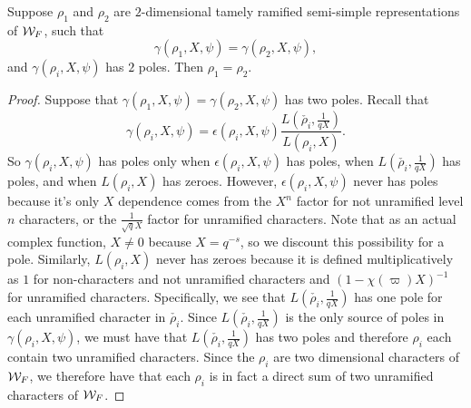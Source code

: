 \begin{lemma}
  \label{lem:gamma-two-poles}
  Suppose $\rho_1$ and $\rho_2$ are $2$-dimensional tamely ramified semi-simple representations of $\mathcal{W}_F$, such that
  \[\gamma(\rho_1,X,\psi) = \gamma(\rho_2,X,\psi),\]
  and $\gamma(\rho_i,X,\psi)$ has $2$ poles.
  Then $\rho_1 = \rho_2$.
\end{lemma}

\begin{proof}
  Suppose that $\gamma(\rho_1,X,\psi) = \gamma(\rho_2,X,\psi)$ has two poles.
  Recall that
  \[\gamma(\rho_i,X,\psi) = \epsilon(\rho_i,X,\psi) \frac{L(\check{\rho_i},\frac{1}{qX})}{L(\rho_i,X)}.\]
  So $\gamma(\rho_i,X,\psi)$ has poles only when $\epsilon(\rho_i,X,\psi)$ has poles, when $L(\check{\rho_i},\frac{1}{qX})$ has poles, and when $L(\rho_i,X)$ has zeroes.
  However, $\epsilon(\rho_i,X,\psi)$ never has poles because it's only $X$ dependence comes from the $X^n$ factor for not unramified level $n$ characters, or the $\frac{1}{\sqrt{q}X}$ factor for unramified characters.
  Note that as an actual complex function, $X \neq 0$ because $X = q^{-s}$, so we discount this possibility for a pole.
  Similarly, $L(\rho_i,X)$ never has zeroes because it is defined multiplicatively as $1$ for non-characters and not unramified characters and $(1 - \chi(\varpi)X)^{-1}$ for unramified characters.
  Specifically, we see that $L(\check{\rho_i},\frac{1}{qX})$ has one pole for each unramified character in $\check{\rho_i}$.
  Since $L(\check{\rho_i}, \frac{1}{qX})$ is the only source of poles in $\gamma(\rho_i,X,\psi)$, we must have that $L(\check{\rho_i},\frac{1}{qX})$ has two poles and therefore $\rho_i$ each contain two unramified characters.
  Since the $\rho_i$ are two dimensional characters of $\mathcal{W}_F$, we therefore have that each $\rho_i$ is in fact a direct sum of two unramified characters of $\mathcal{W}_F$.


\end{proof}
